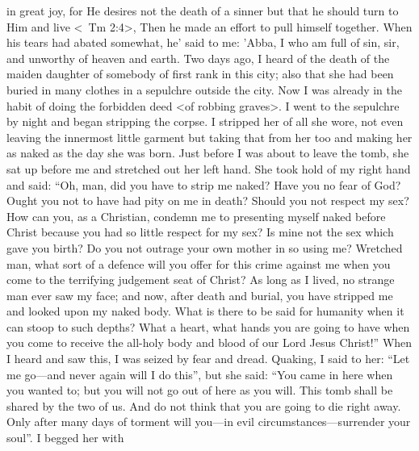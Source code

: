 in great joy, for He desires not the death of a sinner but that he
should turn to Him and live <\ Tm 2:4>, Then he made an effort
to pull himself together. When his tears had abated somewhat, he'
said to me: 'Abba, I who am full of sin, sir, and unworthy of
heaven and earth. Two days ago, I heard of the death of the maiden
daughter of somebody of first rank in this city; also that she had
been buried in many clothes in a sepulchre outside the city. Now I
was already in the habit of doing the forbidden deed <of robbing
graves>. I went to the sepulchre by night and began stripping the
corpse. I stripped her of all she wore, not even leaving the innermost
little garment but taking that from her too and making her as naked
as the day she was born. Just before I was about to leave the tomb,
she sat up before me and stretched out her left hand. She took hold
of my right hand and said: “Oh, man, did you have to strip me
naked? Have you no fear of God? Ought you not to have had pity
on me in death? Should you not respect my sex? How can you, as
a Christian, condemn me to presenting myself naked before Christ
because you had so little respect for my sex? Is mine not the sex
which gave you birth? Do you not outrage your own mother in so
using me? Wretched man, what sort of a defence will you offer for
this crime against me when you come to the terrifying judgement
seat of Christ? As long as I lived, no strange man ever saw my face;
and now, after death and burial, you have stripped me and looked
upon my naked body. What is there to be said for humanity when
it can stoop to such depths? What a heart, what hands you are
going to have when you come to receive the all-holy body and
blood of our Lord Jesus Christ!” When I heard and saw this, I was
seized by fear and dread. Quaking, I said to her: “Let me go—and
never again will I do this”, but she said: “You came in here when
you wanted to; but you will not go out of here as you will. This
tomb shall be shared by the two of us. And do not think that you
are going to die right away. Only after many days of torment will
you—in evil circumstances—surrender your soul”. I begged her with

